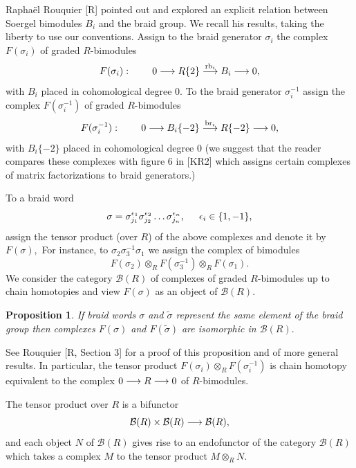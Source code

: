 \documentclass[12pt]{article}
\newtheorem{prop}{Proposition}
\begin{document}
\noindent 
Rapha\"el Rouquier [R] pointed out and explored an explicit relation between 
Soergel 
bimodules $B_i$ and the braid group. We recall his results, taking the liberty to use
our conventions. Assign to the braid generator $\sigma_i$ the complex 
$F(\sigma_i)$ of graded $R$-bimodules 
$$F(\sigma_i): \hspace{0.3in} 
  0 \longrightarrow R\{2\} \stackrel{\mathrm{rb}_i}{\longrightarrow} B_i \longrightarrow 0,$$ 
with $B_i$ placed in cohomological degree $0.$ 
To the braid generator $\sigma_i^{-1}$ assign the complex 
$F(\sigma_i^{-1})$ of graded $R$-bimodules 
$$F(\sigma_i^{-1}): \hspace{0.3in}
  0 \longrightarrow B_i\{-2\} \stackrel{\mathrm{br}_i}{\longrightarrow} R\{-2\} \longrightarrow 0,$$
with $B_i\{-2\}$ placed in cohomological degree $0$ (we suggest that 
the reader compares these complexes with figure 6 in [KR2] which 
assigns certain complexes of matrix factorizations to braid generators.) 

To a braid word 
\begin{equation}\label{sigma}
 \sigma = \sigma_{j_1}^{\epsilon_1} \sigma_{j_2}^{\epsilon_2} 
 \dots \sigma_{j_n}^{\epsilon_n}, \hspace{0.2in} \epsilon_i\in \{1, -1\},
\end{equation}  
assign the tensor product (over $R$) of the above complexes and denote 
it by $F(\sigma),$  
For instance, to $\sigma_2 \sigma_3^{-1}\sigma_1$ we assign 
the complex of bimodules 
$$ F(\sigma_2)\otimes_R F(\sigma_3^{-1}) \otimes_R F(\sigma_1).$$ 
We consider the category $\mathcal{B}(R)$ of complexes of graded $R$-bimodules 
up to chain homotopies and view $F(\sigma)$ as an object of $\mathcal{B}(R).$ 

\begin{prop} If braid words $\sigma$ and $\widetilde{\sigma}$ represent 
the same element of the braid group then complexes $F(\sigma)$ and 
$F(\widetilde{\sigma})$ are isomorphic in $\mathcal{B}(R).$ 
\end{prop} 

See Rouquier [R, Section 3] for a proof of this proposition and of more general 
results. In particular, the tensor product $F(\sigma_i)\otimes_R F(\sigma_i^{-1})$ is 
chain homotopy equivalent to the complex $0 \longrightarrow R \longrightarrow 0$ of $R$-bimodules. 

The tensor product over $R$ is a bifunctor 
$$ \mathcal{B}(R) \times \mathcal{B}(R) \longrightarrow \mathcal{B}(R),$$ 
and each object $N$ of $\mathcal{B}(R)$ gives rise to an endofunctor 
of the category $\mathcal{B}(R)$ which takes a complex $M$ 
to the tensor product $M\otimes_R N.$ 
\end{document}
